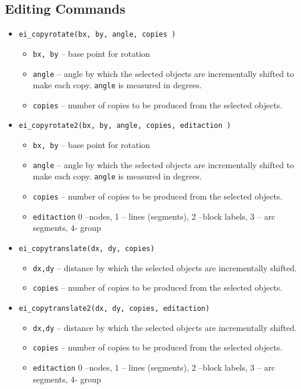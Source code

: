 \subsection{Editing Commands}
\begin{itemize}
\item{\tt ei\_copyrotate(bx, by, angle, copies )}
        \begin{itemize}
        \item{\tt bx, by} -- base point for rotation
        \item{\tt angle} -- angle by which the selected objects are incrementally
        shifted to make each copy.  {\tt angle} is measured in degrees.
        \item{\tt copies} -- number of copies to be produced from
        the selected objects.
        \end{itemize}

\item{\tt ei\_copyrotate2(bx, by, angle, copies, editaction )}
        \begin{itemize}
        \item{\tt bx, by} -- base point for rotation
        \item{\tt angle} -- angle by which the selected objects are incrementally
        shifted to make each copy.  {\tt angle} is measured in degrees.
        \item{\tt copies} -- number of copies to be produced from
        the selected objects.
        \item{\tt editaction}  0 --nodes, 1 -- lines (segments), 2 --block labels, 3 -- arc
                segments, 4- group
        \end{itemize}

\item{\tt ei\_copytranslate(dx, dy, copies)}
        \begin{itemize}
        \item{\tt dx,dy} -- distance by which the selected objects are incrementally shifted.
        \item{\tt copies} -- number of copies to be produced from the selected objects.
        \end{itemize}

\item{\tt ei\_copytranslate2(dx, dy, copies, editaction)}
        \begin{itemize}
        \item{\tt dx,dy} -- distance by which the selected objects are incrementally shifted.
        \item{\tt copies} -- number of copies to be produced from the selected objects.
        \item{\tt editaction}  0 --nodes, 1 -- lines (segments), 2 --block labels, 3 -- arc
                segments, 4- group
        \end{itemize}


\end{itemize}
